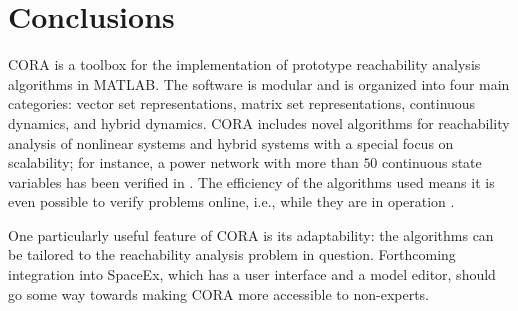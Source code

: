\section{Conclusions}

CORA is a toolbox for the implementation of prototype reachability analysis algorithms in MATLAB. The software is modular and is organized into four main categories: vector set representations, matrix set representations, continuous dynamics, and hybrid dynamics. CORA includes novel algorithms for reachability analysis of nonlinear systems and hybrid systems with a special focus on scalability; for instance, a power network with more than $50$ continuous state variables has been verified in \cite{Althoff2014c}. The efficiency of the algorithms used means it is even possible to verify problems online, i.e., while they are in operation \cite{Althoff2014b}.

One particularly useful feature of CORA is its adaptability: the algorithms can be tailored to the reachability analysis problem in question. Forthcoming integration into SpaceEx, which has a user interface and a model editor, should go some way towards making CORA more accessible to non-experts.

